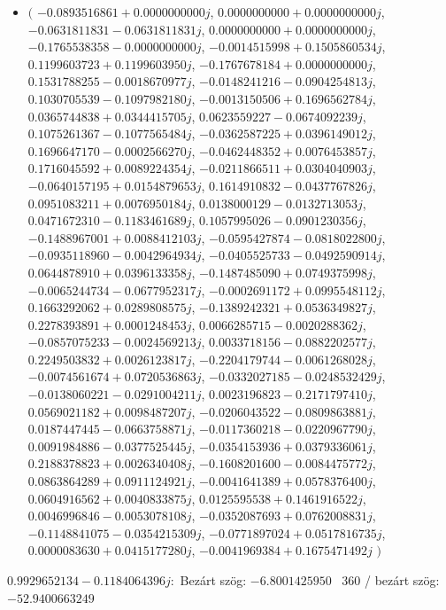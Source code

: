 \documentclass[14pt,a4paper]{article}
\begin{document}
\begin{itemize}
\item
$\big($
$-0.0893516861+0.0000000000j$, $0.0000000000+0.0000000000j$, $-0.0631811831-0.0631811831j$, $0.0000000000+0.0000000000j$, $-0.1765538358-0.0000000000j$, $-0.0014515998+0.1505860534j$, $0.1199603723+0.1199603950j$, $-0.1767678184+0.0000000000j$, $0.1531788255-0.0018670977j$, $-0.0148241216-0.0904254813j$, $0.1030705539-0.1097982180j$, $-0.0013150506+0.1696562784j$, $0.0365744838+0.0344415705j$, $0.0623559227-0.0674092239j$, $0.1075261367-0.1077565484j$, $-0.0362587225+0.0396149012j$, $0.1696647170-0.0002566270j$, $-0.0462448352+0.0076453857j$, $0.1716045592+0.0089224354j$, $-0.0211866511+0.0304040903j$, $-0.0640157195+0.0154879653j$, $0.1614910832-0.0437767826j$, $0.0951083211+0.0076950184j$, $0.0138000129-0.0132713053j$, $0.0471672310-0.1183461689j$, $0.1057995026-0.0901230356j$, $-0.1488967001+0.0088412103j$, $-0.0595427874-0.0818022800j$, $-0.0935118960-0.0042964934j$, $-0.0405525733-0.0492590914j$, $0.0644878910+0.0396133358j$, $-0.1487485090+0.0749375998j$, $-0.0065244734-0.0677952317j$, $-0.0002691172+0.0995548112j$, $0.1663292062+0.0289808575j$, $-0.1389242321+0.0536349827j$, $0.2278393891+0.0001248453j$, $0.0066285715-0.0020288362j$, $-0.0857075233-0.0024569213j$, $0.0033718156-0.0882202577j$, $0.2249503832+0.0026123817j$, $-0.2204179744-0.0061268028j$, $-0.0074561674+0.0720536863j$, $-0.0332027185-0.0248532429j$, $-0.0138060221-0.0291004211j$, $0.0023196823-0.2171797410j$, $0.0569021182+0.0098487207j$, $-0.0206043522-0.0809863881j$, $0.0187447445-0.0663758871j$, $-0.0117360218-0.0220967790j$, $0.0091984886-0.0377525445j$, $-0.0354153936+0.0379336061j$, $0.2188378823+0.0026340408j$, $-0.1608201600-0.0084475772j$, $0.0863864289+0.0911124921j$, $-0.0041641389+0.0578376400j$, $0.0604916562+0.0040833875j$, $0.0125595538+0.1461916522j$, $0.0046996846-0.0053078108j$, $-0.0352087693+0.0762008831j$, $-0.1148841075-0.0354215309j$, $-0.0771897024+0.0517816735j$, $0.0000083630+0.0415177280j$, $-0.0041969384+0.1675471492j$
$\big)$
\end{itemize}
$0.9929652134-0.1184064396j$:\
Bezárt szög: $-6.8001425950$ \
360 / bezárt szög: $-52.9400663249$\
\end{document}
